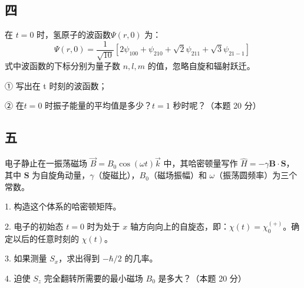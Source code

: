 \subsection{四}
在 $t = 0 $ 时，氢原子的波函数$\Psi(r, 0)$ 为：$$\Psi(r, 0) = \frac{1}{\sqrt{10}} \left[ 2\psi_{100} + \psi_{210} + \sqrt{2}\psi_{211} + \sqrt{3}\psi_{21-1} \right]~$$
式中波函数的下标分别为量子数 $ n, l, m $ 的值，忽略自旋和辐射跃迁。

①  写出在 t 时刻的波函数；

② 在$ t = 0$ 时振子能量的平均值是多少？$t = 1$ 秒时呢？（本题 20 分）

\subsection{五}
电子静止在一振荡磁场 $\vec{B} = B_0 \cos(\omega t) {\vec{k}}$ 中，其哈密顿量写作 $\hat{H} = - \gamma \mathbf{B} \cdot \mathbf{S}$，其中 $\mathbf{S}$ 为自旋角动量，$\gamma$（旋磁比），$B_0$（磁场振幅）和 $\omega$（振荡圆频率）为三个常数。

1. 构造这个体系的哈密顿矩阵。

2. 电子的初始态 $t = 0$ 时为处于 $x$ 轴方向向上的自旋态，即：$\chi (t) = \chi_{0}^{(+)}$。确定以后的任意时刻的 $\chi (t)$。

3. 如果测量 $S_x$，求出得到 $- \hbar / 2$ 的几率。

4. 迫使 $S_z$ 完全翻转所需要的最小磁场 $B_0$ 是多大？（本题 20 分）
